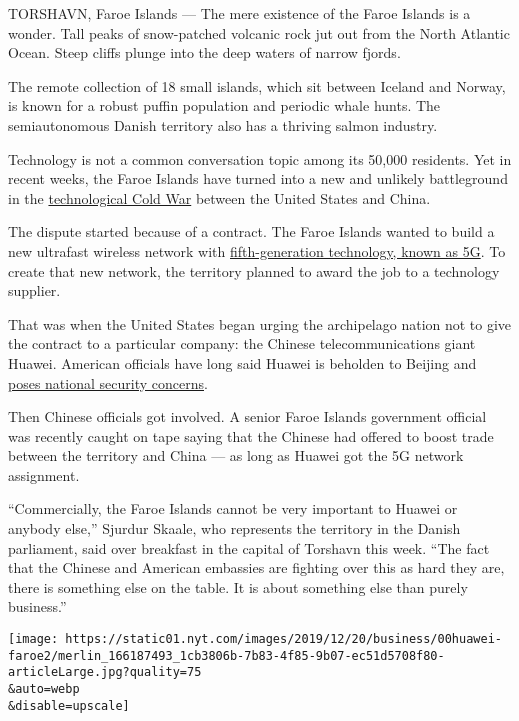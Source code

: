 TORSHAVN, Faroe Islands --- The mere existence of the Faroe Islands is a
wonder. Tall peaks of snow-patched volcanic rock jut out from the North
Atlantic Ocean. Steep cliffs plunge into the deep waters of narrow
fjords.

The remote collection of 18 small islands, which sit between Iceland and
Norway, is known for a robust puffin population and periodic whale
hunts. The semiautonomous Danish territory also has a thriving salmon
industry.

Technology is not a common conversation topic among its 50,000
residents. Yet in recent weeks, the Faroe Islands have turned into a new
and unlikely battleground in the
\href{https://www.nytimes.com/2018/03/23/technology/trump-china-tariffs-tech-cold-war.html}{technological
Cold War} between the United States and China.

The dispute started because of a contract. The Faroe Islands wanted to
build a new ultrafast wireless network with
\href{https://www.nytimes.com/2018/12/31/technology/personaltech/5g-what-you-need-to-know.html}{fifth-generation
technology, known as 5G}. To create that new network, the territory
planned to award the job to a technology supplier.

That was when the United States began urging the archipelago nation not
to give the contract to a particular company: the Chinese
telecommunications giant Huawei. American officials have long said
Huawei is beholden to Beijing and
\href{https://www.nytimes.com/2019/08/07/business/huawei-us-ban.html}{poses
national security concerns}.

Then Chinese officials got involved. A senior Faroe Islands government
official was recently caught on tape saying that the Chinese had offered
to boost trade between the territory and China --- as long as Huawei got
the 5G network assignment.

``Commercially, the Faroe Islands cannot be very important to Huawei or
anybody else,'' Sjurdur Skaale, who represents the territory in the
Danish parliament, said over breakfast in the capital of Torshavn this
week. ``The fact that the Chinese and American embassies are fighting
over this as hard they are, there is something else on the table. It is
about something else than purely business.''

\texttt{[image: https://static01.nyt.com/images/2019/12/20/business/00huawei-faroe2/merlin\_166187493\_1cb3806b-7b83-4f85-9b07-ec51d5708f80-articleLarge.jpg?quality=75\\\&auto=webp\\\&disable=upscale]}

